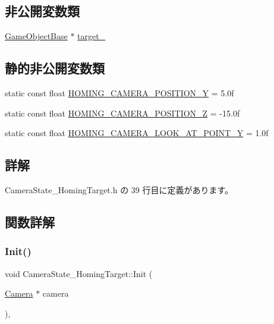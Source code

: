 \subsection*{非公開変数類}
\begin{DoxyCompactItemize}
\item 
\mbox{\hyperlink{class_game_object_base}{Game\+Object\+Base}} $\ast$ \mbox{\hyperlink{class_camera_state___homing_target_a302d9fb35f1e46dab9a320287556c769}{target\+\_\+}}
\end{DoxyCompactItemize}
\subsection*{静的非公開変数類}
\begin{DoxyCompactItemize}
\item 
static const float \mbox{\hyperlink{class_camera_state___homing_target_a89dd98acec1474af5afb21d17fca4196}{H\+O\+M\+I\+N\+G\+\_\+\+C\+A\+M\+E\+R\+A\+\_\+\+P\+O\+S\+I\+T\+I\+O\+N\+\_\+Y}} = 5.\+0f
\item 
static const float \mbox{\hyperlink{class_camera_state___homing_target_ac858a396ea1e8ee84eed407321b3a140}{H\+O\+M\+I\+N\+G\+\_\+\+C\+A\+M\+E\+R\+A\+\_\+\+P\+O\+S\+I\+T\+I\+O\+N\+\_\+Z}} = -\/15.\+0f
\item 
static const float \mbox{\hyperlink{class_camera_state___homing_target_ab526a9a9aef20d87a1358ca8c4b4f075}{H\+O\+M\+I\+N\+G\+\_\+\+C\+A\+M\+E\+R\+A\+\_\+\+L\+O\+O\+K\+\_\+\+A\+T\+\_\+\+P\+O\+I\+N\+T\+\_\+Y}} = 1.\+0f
\end{DoxyCompactItemize}


\subsection{詳解}


 Camera\+State\+\_\+\+Homing\+Target.\+h の 39 行目に定義があります。



\subsection{関数詳解}
\mbox{\label{class_camera_state___homing_target_a9222190a5f26d564e99623b05941d382}} 
\subsubsection{\texorpdfstring{Init()}{Init()}}
{\footnotesize\ttfamily void Camera\+State\+\_\+\+Homing\+Target\+::\+Init (\begin{DoxyParamCaption}\item[{\mbox{\hyperlink{class_camera}{Camera}} $\ast$}]{camera }\end{DoxyParamCaption})\hspace{0.3cm}{\ttfamily [override]}, {\ttfamily [virtual]}}



